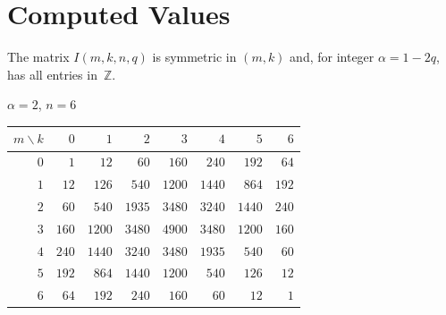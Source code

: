 \documentclass[11pt,a4paper]{article}
\theoremstyle{plain}
\theoremstyle{definition}
\begin{document}
\section{Computed Values}

The matrix $I(m,k,n,q)$ is symmetric in $(m,k)$ and, for integer
$\alpha = 1 - 2q$, has all entries in~$\mathbb{Z}$.

\begin{tcolorbox}[colback=black!5, colframe=black!5, boxrule=0pt,
  sharp corners]
\begin{center}
$\alpha = 2$, $n = 6$

\medskip
\begin{tabular}{r|rrrrrrr}
$m \!\backslash\! k$ & $0$ & $1$ & $2$ & $3$ & $4$ & $5$ & $6$ \\
\hline
$0$ & $1$ & $12$ & $60$ & $160$ & $240$ & $192$ & $64$ \\
$1$ & $12$ & $126$ & $540$ & $1200$ & $1440$ & $864$ & $192$ \\
$2$ & $60$ & $540$ & $1935$ & $3480$ & $3240$ & $1440$ & $240$ \\
$3$ & $160$ & $1200$ & $3480$ & $4900$ & $3480$ & $1200$ & $160$ \\
$4$ & $240$ & $1440$ & $3240$ & $3480$ & $1935$ & $540$ & $60$ \\
$5$ & $192$ & $864$ & $1440$ & $1200$ & $540$ & $126$ & $12$ \\
$6$ & $64$ & $192$ & $240$ & $160$ & $60$ & $12$ & $1$ \\
\end{tabular}
\end{center}
\end{tcolorbox}
\end{document}
